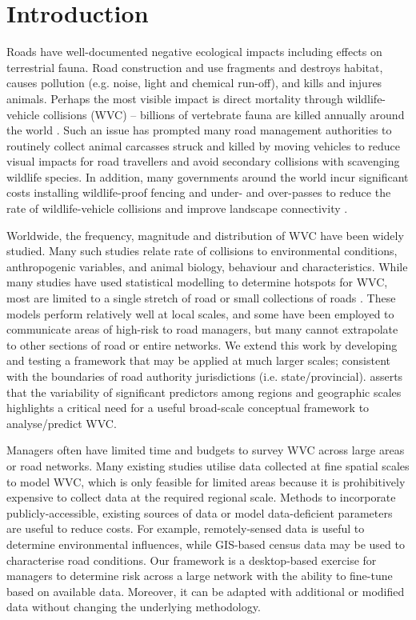 \newpage
\section{Introduction}

Roads have well-documented negative ecological impacts \citep{form98,spel98,rvdr15} including effects on terrestrial fauna. Road construction and use fragments and destroys habitat, causes pollution (e.g. noise, light and chemical run-off), and kills and injures animals. Perhaps the most visible impact is direct mortality through wildlife-vehicle collisions (WVC) -- billions of vertebrate fauna are killed annually around the world \citep{seil06}. Such an issue has prompted many road management authorities to routinely collect animal carcasses struck and killed by moving vehicles to reduce visual impacts for road travellers \citep{huij07b} and avoid secondary collisions with scavenging wildlife species. In addition, many governments around the world incur significant costs installing wildlife-proof fencing and under- and over-passes to reduce the rate of wildlife-vehicle collisions and improve landscape connectivity \citep{rvdr15}.

Worldwide, the frequency, magnitude and distribution of WVC have been widely studied. Many such studies relate rate of collisions to environmental conditions, anthropogenic variables, and animal biology, behaviour and characteristics. While many studies have used statistical modelling to determine hotspots for WVC, most are limited to a single stretch of road or small collections of roads \citep[e.g.][]{gund98,clev02,clev03,ramp05,ramp06b,gome08,lang09,hurl09,roge09,hoth12,mark12,sant13,seo15}. These models perform relatively well at local scales, and some have been employed to communicate areas of high-risk to road managers, but many cannot extrapolate to other sections of road or entire networks. We extend this work by developing and testing a framework that may be applied at much larger scales; consistent with the boundaries of road authority jurisdictions (i.e. state/provincial). \cite{clev15} asserts that the variability of significant predictors among regions and geographic scales highlights a critical need for a useful broad-scale conceptual framework to analyse/predict WVC.

Managers often have limited time and budgets to survey WVC across large areas or road networks. Many existing studies utilise data collected at fine spatial scales to model WVC, which is only feasible for limited areas because it is prohibitively expensive to collect data at the required regional scale. Methods to incorporate publicly-accessible, existing sources of data or model data-deficient parameters are useful to reduce costs. For example, remotely-sensed data is useful to determine environmental influences, while GIS-based census data may be used to characterise road conditions. Our framework is a desktop-based exercise for managers to determine risk across a large network with the ability to fine-tune based on available data. Moreover, it can be adapted with additional or modified data without changing the underlying methodology.

